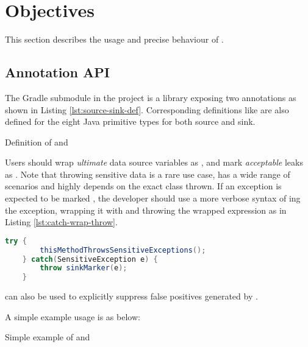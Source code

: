 \section{Objectives}
This section describes the usage and precise behaviour of \pname{}.

\subsection{Annotation API}
The  Gradle submodule in the project
is a  library exposing two annotations
as shown in Listing \ref{lst:source-sink-def}.
Corresponding definitions like 
are also defined for the eight Java primitive types
for both source and sink.

{Definition of  and }

Users should wrap \emph{ultimate} data source variables as ,
and mark \emph{acceptable} leaks as .
Note that throwing sensitive data is a rare use case,
has a wide range of scenarios
and highly depends on the exact class thrown.
If an exception is expected to be marked ,
the developer should use a more verbose syntax of ing the exception,
wrapping it with  and throwing the wrapped expression as in Listing \ref{lst:catch-wrap-throw}.

\begin{lstlisting}[style=j, language=java, label={lst:catch-wrap-throw},
caption={Catch-wrap-throw construct}]
    try {
        thisMethodThrowsSensitiveExceptions();
    } catch(SensitiveException e) {
        throw sinkMarker(e);
    }
\end{lstlisting}

 can also be used to explicitly suppress false positives generated by \pname{}.

A simple example usage is as below:

{Simple example of  and }

